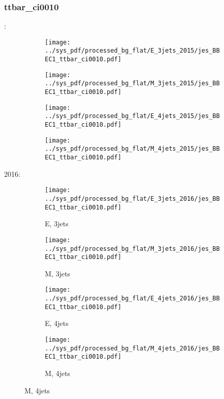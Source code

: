 \documentclass{beamer}
\begin{document}
\begin{frame}
\frametitle{ttbar_ci0010}
\fontsize{5}{1}:
\begin{figure}
\centering
\begin{subfigure}[b]{0.24\textwidth}
\texttt{[image: ../sys\_pdf/processed\_bg\_flat/E\_3jets\_2015/jes\_BBEC1\_ttbar\_ci0010.pdf]}
\end{subfigure}
\begin{subfigure}[b]{0.24\textwidth}
\texttt{[image: ../sys\_pdf/processed\_bg\_flat/M\_3jets\_2015/jes\_BBEC1\_ttbar\_ci0010.pdf]}
\end{subfigure}
\begin{subfigure}[b]{0.24\textwidth}
\texttt{[image: ../sys\_pdf/processed\_bg\_flat/E\_4jets\_2015/jes\_BBEC1\_ttbar\_ci0010.pdf]}
\end{subfigure}
\begin{subfigure}[b]{0.24\textwidth}
\texttt{[image: ../sys\_pdf/processed\_bg\_flat/M\_4jets\_2015/jes\_BBEC1\_ttbar\_ci0010.pdf]}
\end{subfigure}
\end{figure}
2016:
\begin{figure}
\centering
\begin{subfigure}[b]{0.24\textwidth}
\texttt{[image: ../sys\_pdf/processed\_bg\_flat/E\_3jets\_2016/jes\_BBEC1\_ttbar\_ci0010.pdf]}
\captionsetup{font=tiny}
\caption{E, 3jets}
\end{subfigure}
\begin{subfigure}[b]{0.24\textwidth}
\texttt{[image: ../sys\_pdf/processed\_bg\_flat/M\_3jets\_2016/jes\_BBEC1\_ttbar\_ci0010.pdf]}
\captionsetup{font=tiny}
\caption{M, 3jets}
\end{subfigure}
\begin{subfigure}[b]{0.24\textwidth}
\texttt{[image: ../sys\_pdf/processed\_bg\_flat/E\_4jets\_2016/jes\_BBEC1\_ttbar\_ci0010.pdf]}
\captionsetup{font=tiny}
\caption{E, 4jets}
\end{subfigure}
\begin{subfigure}[b]{0.24\textwidth}
\texttt{[image: ../sys\_pdf/processed\_bg\_flat/M\_4jets\_2016/jes\_BBEC1\_ttbar\_ci0010.pdf]}
\captionsetup{font=tiny}
\caption{M, 4jets}
\end{subfigure}
\end{figure}
\end{frame}
\end{document}
